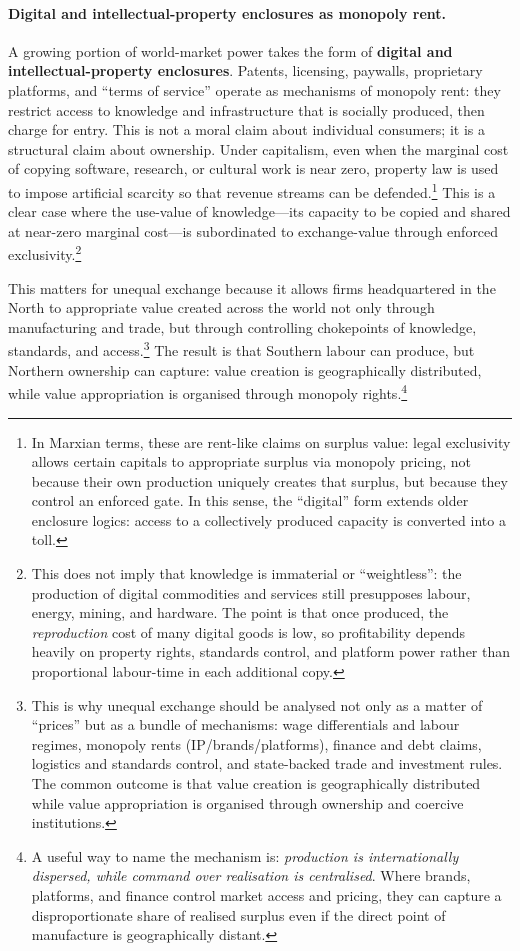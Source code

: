 \paragraph{Digital and intellectual-property enclosures as monopoly rent.}
A growing portion of world-market power takes the form of \textbf{digital and intellectual-property enclosures}.
Patents, licensing, paywalls, proprietary platforms, and ``terms of service'' operate as mechanisms of monopoly rent:
they restrict access to knowledge and infrastructure that is socially produced, then charge for entry.
This is not a moral claim about individual consumers; it is a structural claim about ownership. Under capitalism,
even when the marginal cost of copying software, research, or cultural work is near zero, property law is used to
impose artificial scarcity so that revenue streams can be defended.\footnote{In Marxian terms, these are rent-like claims
on surplus value: legal exclusivity allows certain capitals to appropriate surplus via monopoly pricing, not because their
own production uniquely creates that surplus, but because they control an enforced gate. In this sense, the ``digital'' form
extends older enclosure logics: access to a collectively produced capacity is converted into a toll.}
This is a clear case where the use-value of knowledge---its capacity to be copied and shared at near-zero marginal cost---is
subordinated to exchange-value through enforced exclusivity.\footnote{This does not imply that knowledge is immaterial or
``weightless'': the production of digital commodities and services still presupposes labour, energy, mining, and hardware.
The point is that once produced, the \emph{reproduction} cost of many digital goods is low, so profitability depends heavily
on property rights, standards control, and platform power rather than proportional labour-time in each additional copy.}

This matters for unequal exchange because it allows firms headquartered in the North to appropriate value created across the world
not only through manufacturing and trade, but through controlling chokepoints of knowledge, standards, and access.\footnote{This is why unequal exchange
should be analysed not only as a matter of ``prices'' but as a bundle of mechanisms: wage differentials and labour regimes, monopoly rents (IP/brands/platforms), finance
and debt claims, logistics and standards control, and state-backed trade and investment rules. The common outcome is that value creation is geographically distributed while
value appropriation is organised through ownership and coercive institutions.}
The result is that Southern labour can produce, but Northern ownership can capture: value creation is geographically distributed,
while value appropriation is organised through monopoly rights.\footnote{A useful way to name the mechanism is:
\emph{production is internationally dispersed, while command over realisation is centralised}. Where brands, platforms, and finance control market access and pricing,
they can capture a disproportionate share of realised surplus even if the direct point of manufacture is geographically distant.}


